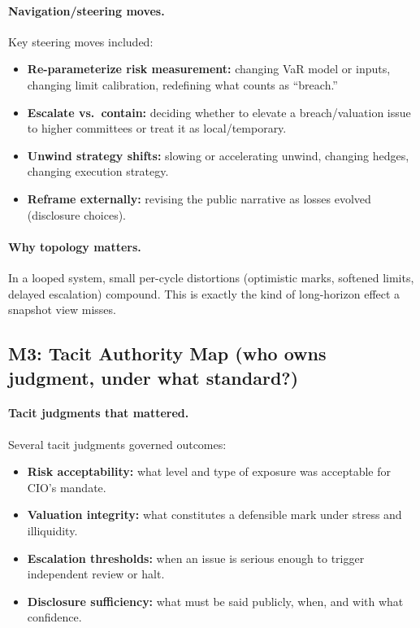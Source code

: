 \paragraph{Navigation/steering moves.}
Key steering moves included:
\begin{itemize}
\item \textbf{Re-parameterize risk measurement:} changing VaR model or inputs, changing limit calibration, redefining what counts as “breach.”
\item \textbf{Escalate vs.\ contain:} deciding whether to elevate a breach/valuation issue to higher committees or treat it as local/temporary.
\item \textbf{Unwind strategy shifts:} slowing or accelerating unwind, changing hedges, changing execution strategy.
\item \textbf{Reframe externally:} revising the public narrative as losses evolved (disclosure choices).
\end{itemize}

\paragraph{Why topology matters.}
In a looped system, small per-cycle distortions (optimistic marks, softened limits, delayed escalation) compound. This is exactly the kind of long-horizon effect a snapshot view misses.

\subsection{M3: Tacit Authority Map (who owns judgment, under what standard?)}
\label{subsec:lw-m3}

\paragraph{Tacit judgments that mattered.}
Several tacit judgments governed outcomes:
\begin{itemize}
\item \textbf{Risk acceptability:} what level and type of exposure was acceptable for CIO’s mandate.
\item \textbf{Valuation integrity:} what constitutes a defensible mark under stress and illiquidity.
\item \textbf{Escalation thresholds:} when an issue is serious enough to trigger independent review or halt.
\item \textbf{Disclosure sufficiency:} what must be said publicly, when, and with what confidence.
\end{itemize}

